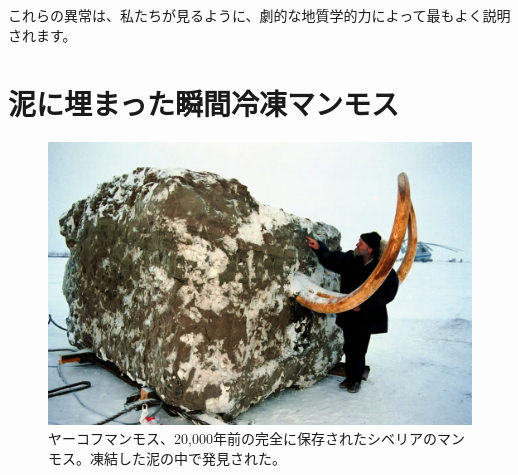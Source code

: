 \documentclass[10pt,twocolumn,letterpaper]{article}
\begin{document}
これらの異常は、私たちが見るように、劇的な地質学的力によって最もよく説明されます。

\section{泥に埋まった瞬間冷凍マンモス}

\begin{figure}[t]
\begin{center}
   \includegraphics[width=1\linewidth]{jarkov-mammoth.jpg}
\end{center}
   \caption{ヤーコフマンモス、20,000年前の完全に保存されたシベリアのマンモス。凍結した泥の中で発見された\cite{51}。}
\label{fig:1}
\label{fig:onecol}
\end{figure}
\end{document}
